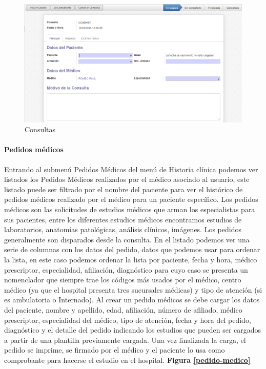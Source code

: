 \begin{figure}[h]
      \centering
      \includegraphics[width=.8\textwidth]{img/tp1/HE/ConsultaDia}
      \caption{Consultas}
      \label{consulta-dia}
\end{figure}


\paragraph{Pedidos médicos}

Entrando al submenú Pedidos Médicos del menú de Historia clínica podemos ver listados los Pedidos Médicos realizados por el médico asociado al usuario, este listado puede ser filtrado por el nombre del paciente para ver el histórico de pedidos médicos realizado por el médico para un paciente específico. Los pedidos médicos son las solicitudes de estudios médicos que arman los especialistas para sus pacientes, entre los diferentes estudios médicos encontramos estudios de laboratorios, anatomías patológicas, análisis clínicos, imágenes. Los pedidos generalmente son disparados desde la consulta. En el listado podemos ver una serie de columnas con los datos del pedido, datos que podemos usar para ordenar la lista, en este caso podemos ordenar la lista por paciente, fecha y hora, médico prescriptor, especialidad, afiliación, diagnóstico para cuyo caso se presenta un nomenclador que siempre trae los códigos más usados por el médico, centro médico (ya que el hospital presenta tres sucursales médicas) y tipo de atención (si es ambulatoria o Internado). Al crear un pedido médicos se debe cargar los datos del paciente, nombre y apellido, edad, afiliación, número de afiliado, médico prescriptor, especialidad del médico, tipo de atención, fecha y hora del pedido, diagnóstico y el detalle del pedido indicando los estudios que pueden ser cargados a partir de una plantilla previamente cargada. Una vez finalizada la carga, el pedido se imprime, se firmado por el médico y el paciente lo usa como comprobante para hacerse el estudio en el hospital. \textbf{Figura \ref{pedido-medico}}

